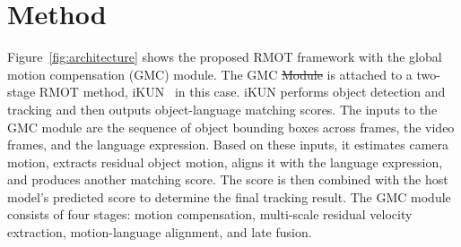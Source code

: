 \documentclass{article}
\makeatletter
\providecommand{\DIFadd}[1]{{\protect\color{blue}\uwave{#1}}} %
\providecommand{\DIFdel}[1]{{\protect\color{red}\sout{#1}}} %
\providecommand{\DIFaddbegin}{} %
\providecommand{\DIFaddend}{} %
\providecommand{\DIFdelbegin}{} %
\providecommand{\DIFdelend}{} %
\providecommand{\DIFscaledelfig}{0.5}
\newlength{\DIFdelgraphicswidth} %
\newlength{\DIFdelgraphicsheight} %
\providecommand{\DIFaddincludegraphics}[2][]{{\color{blue}\fbox{\DIFOincludegraphics[#1]{#2}}}} %
\providecommand{\DIFdelincludegraphics}[2][]{%
\sbox{\DIFdelgraphicsbox}{\DIFOincludegraphics[#1]{#2}}%
\settoboxwidth{\DIFdelgraphicswidth}{\DIFdelgraphicsbox} %
\settoboxtotalheight{\DIFdelgraphicsheight}{\DIFdelgraphicsbox} %
\scalebox{\DIFscaledelfig}{%
\parbox[b]{\DIFdelgraphicswidth}{\usebox{\DIFdelgraphicsbox}\\[-\baselineskip] \rule{\DIFdelgraphicswidth}{0em}}\llap{\resizebox{\DIFdelgraphicswidth}{\DIFdelgraphicsheight}{%
\setlength{\unitlength}{\DIFdelgraphicswidth}%
\begin{picture}(1,1)%
\thicklines\linethickness{2pt} %
{\color[rgb]{1,0,0}\put(0,0){\framebox(1,1){}}}%
{\color[rgb]{1,0,0}\put(0,0){\line( 1,1){1}}}%
{\color[rgb]{1,0,0}\put(0,1){\line(1,-1){1}}}%
\end{picture}%
}\hspace*{3pt}}} %
} %
\DeclareRobustCommand{\DIFaddbegin}{\DIFOaddbegin \let\includegraphics\DIFaddincludegraphics} %
\DeclareRobustCommand{\DIFaddend}{\DIFOaddend \let\includegraphics\DIFOincludegraphics} %
\DeclareRobustCommand{\DIFdelbegin}{\DIFOdelbegin \let\includegraphics\DIFdelincludegraphics} %
\DeclareRobustCommand{\DIFdelend}{\DIFOaddend \let\includegraphics\DIFOincludegraphics} %
\let\sout@orig\sout %
\renewcommand{\sout}[1]{\ifmmode\text{\sout@orig{\ensuremath{#1}}}\else\sout@orig{#1}\fi} %
\makeatother
\begin{document}

\DIFdelend %


\section{Method}
\label{sec:method}
Figure~\ref{fig:architecture} shows the proposed RMOT framework with the global motion compensation (GMC) module. The GMC \DIFdelbegin \DIFdel{Module }\DIFdelend \DIFaddbegin \DIFadd{module }\DIFaddend is attached to a two-stage RMOT method, iKUN~\cite{ikun} in this case. iKUN performs object detection and tracking and then outputs object-language matching scores. The inputs to the GMC module are the sequence of object bounding boxes across frames, the video frames, and the language expression. Based on these inputs, it estimates camera motion, extracts residual object motion, aligns it with the language expression, and produces another matching score. The score is then combined with the host model's predicted score to determine the final tracking result. The GMC module consists of four stages: motion compensation, multi-scale residual velocity extraction, motion-language alignment, and late fusion.
\end{document}
